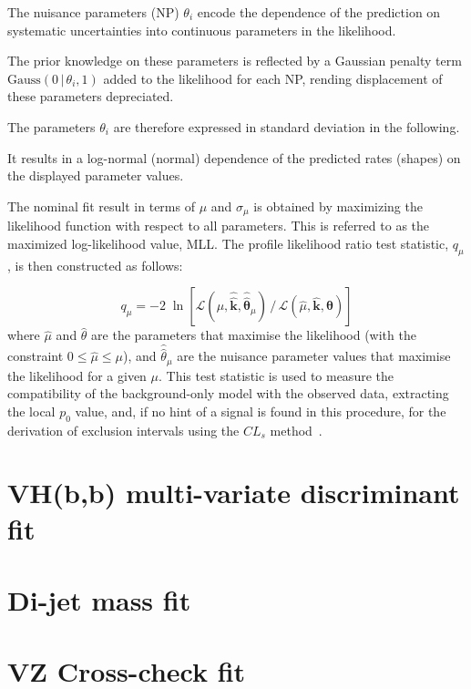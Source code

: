 The nuisance parameters (NP) $\theta_i$ encode the dependence of the prediction
on systematic uncertainties into continuous parameters in the likelihood.

The prior knowledge on these parameters is reflected by a Gaussian penalty term
$\text{Gauss}(0\,|\,\theta_i,1)$ added to the likelihood for each NP, rending
displacement of these parameters depreciated.

The parameters $\theta_i$ are therefore expressed in standard deviation in the
following.

It results in a log-normal (normal) dependence of the predicted rates (shapes)
on the displayed parameter values.


The nominal fit result in terms of $\mu$ and $\sigma_{\mu}$ is obtained by
maximizing the likelihood function with respect to all parameters.  This is
referred to as the maximized log-likelihood value, MLL. The profile likelihood
ratio test statistic, $q_\mu$, is then constructed as follows:

\begin{equation}
  q_\mu = - 2\; \ln \left[ \mathcal{L} (\mu, \hat{\hat{\mathbf{k}}}, \hat{\hat{\boldsymbol\theta}}_{\mu})\, / \, \mathcal{L} (\hat{\mu}, \hat{\mathbf{k}}, \hat{\boldsymbol\theta}) \right]
  
\end{equation}
where $\hat{\mu}$ and $\hat{\theta}$ are the parameters that maximise the
likelihood (with the constraint $0 \leq \hat{\mu} \leq \mu$), and
$\hat{\hat{\theta}}_\mu$ are the nuisance parameter values that maximise the
likelihood for a given $\mu$. This test statistic is used to measure the
compatibility of the background-only model with the observed data, extracting
the local $p_0$ value, and, if no hint of a signal is found in this procedure,
for the derivation of exclusion intervals using the $CL_s$
method~\cite{Cowan:2010js,Read:2002hq}.


\section{VH(b,b) multi-variate discriminant fit}%
\label{sec:mva-fit}
\section{Di-jet mass fit}%
\label{sec:mbb-fit}
\section{VZ Cross-check fit}%
\label{sec:mvadiboson-fit}